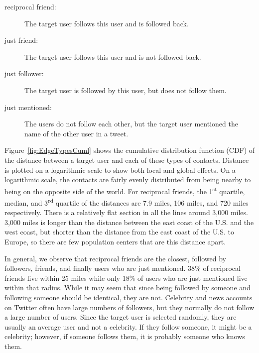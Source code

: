 \documentclass[letterpaper]{article}
\begin{document}
\begin{description}
\item[reciprocal friend:] The target user follows this user and is followed
    back.
\item[just friend:] The target user follows this user and is not followed
    back.
\item[just follower:] The target user is followed by this user, but does
    not follow them.
\item[just mentioned:] The users do not follow each other, but the target
    user mentioned the name of the other user in a tweet.
\end{description}

Figure~\ref{fig:EdgeTypesCuml} shows the cumulative distribution
function (CDF) of the distance between a target user and each of these types of
contacts.
%
Distance is plotted on a logarithmic scale to show both local and
global effects.
%
On a logarithmic scale, the contacts are fairly evenly distributed from being
nearby to being on the opposite side of the world.
%
For reciprocal friends, the 1\textsuperscript{st} quartile, median, and
3\textsuperscript{rd} quartile of the distances are 7.9 miles, 106 miles, and 720 miles
respectively.
%
There is a relatively flat section in all the lines around 3,000 miles.
%
3,000 miles is longer than the distance between the east coast of the U.S. and
the west coast, but shorter than the distance from the east coast of the U.S.
to Europe, so there are few population centers that are this distance apart.

In general, we observe that reciprocal friends are the closest, followed by followers, friends,
and finally users who are just mentioned.
%
38\% of reciprocal friends live within 25 miles while only 18\% of users
who are just mentioned live within that radius.
%
While it may seem that since being followed by someone and following someone
should be identical, they are not.
%
Celebrity and news accounts on Twitter often have large numbers of followers,
but they normally do not follow a large number of users.
%
Since the target user is selected randomly, they are usually an average
user and not a celebrity.
%
If they follow someone, it might be a celebrity; however, if someone follows
them, it is probably someone who knows them.
\end{document}
